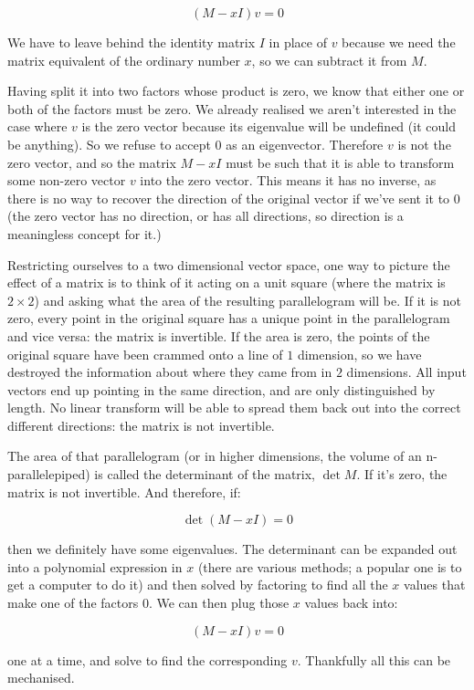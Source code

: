 $$(M - xI)v = 0$$

We have to leave behind the identity matrix $I$ in place of $v$ because we need the matrix equivalent of the ordinary number $x$, so we can subtract it from $M$.

Having split it into two factors whose product is zero, we know that either one or both of the factors must be zero. We already realised we aren't interested in the case where $v$ is the zero vector because its eigenvalue will be undefined (it could be anything). So we refuse to accept $0$ as an eigenvector. Therefore $v$ is not the zero vector, and so the matrix $M - xI$ must be such that it is able to transform some non-zero vector $v$ into the zero vector. This means it has no inverse, as there is no way to recover the direction of the original vector if we've sent it to $0$ (the zero vector has no direction, or has all directions, so direction is a meaningless concept for it.)

Restricting ourselves to a two dimensional vector space, one way to picture the effect of a matrix is to think of it acting on a unit square (where the matrix is $2 \times 2$) and asking what the area of the resulting parallelogram will be. If it is not zero, every point in the original square has a unique point in the parallelogram and vice versa: the matrix is invertible. If the area is zero, the points of the original square have been crammed onto a line of $1$ dimension, so we have destroyed the information about where they came from in $2$ dimensions. All input vectors end up pointing in the same direction, and are only distinguished by length. No linear transform will be able to spread them back out into the correct different directions: the matrix is not invertible.

The area of that parallelogram (or in higher dimensions, the volume of an n-parallelepiped) is called the determinant of the matrix, $\det M$. If it's zero, the matrix is not invertible. And therefore, if:

$$\det{(M - xI)} = 0$$

then we definitely have some eigenvalues. The determinant can be expanded out into a polynomial expression in $x$ (there are various methods; a popular one is to get a computer to do it) and then solved by factoring to find all the $x$ values that make one of the factors $0$. We can then plug those $x$ values back into:

$$(M - xI)v = 0$$

one at a time, and solve to find the corresponding $v$. Thankfully all this can be mechanised.

